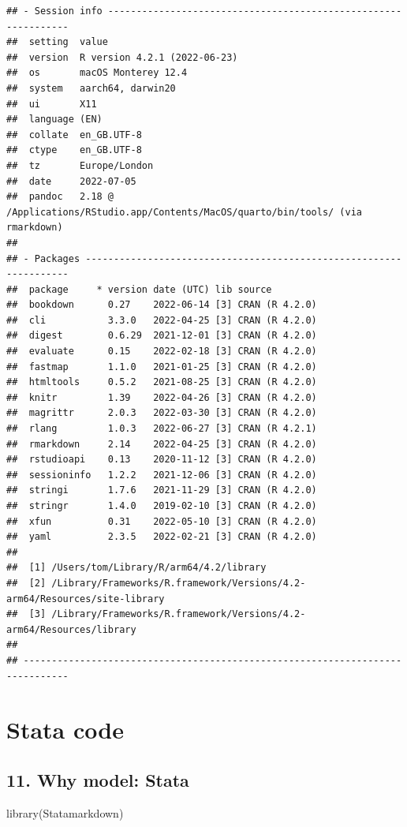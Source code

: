 \documentclass[
  10pt,
]{book}
\newenvironment{Shaded}{\begin{snugshade}}{\end{snugshade}}
\newcommand{\FunctionTok}[1]{\textcolor[rgb]{0.00,0.00,0.00}{#1}}
\newcommand{\NormalTok}[1]{#1}
\begin{document}
\begin{verbatim}
## - Session info ---------------------------------------------------------------
##  setting  value
##  version  R version 4.2.1 (2022-06-23)
##  os       macOS Monterey 12.4
##  system   aarch64, darwin20
##  ui       X11
##  language (EN)
##  collate  en_GB.UTF-8
##  ctype    en_GB.UTF-8
##  tz       Europe/London
##  date     2022-07-05
##  pandoc   2.18 @ /Applications/RStudio.app/Contents/MacOS/quarto/bin/tools/ (via rmarkdown)
## 
## - Packages -------------------------------------------------------------------
##  package     * version date (UTC) lib source
##  bookdown      0.27    2022-06-14 [3] CRAN (R 4.2.0)
##  cli           3.3.0   2022-04-25 [3] CRAN (R 4.2.0)
##  digest        0.6.29  2021-12-01 [3] CRAN (R 4.2.0)
##  evaluate      0.15    2022-02-18 [3] CRAN (R 4.2.0)
##  fastmap       1.1.0   2021-01-25 [3] CRAN (R 4.2.0)
##  htmltools     0.5.2   2021-08-25 [3] CRAN (R 4.2.0)
##  knitr         1.39    2022-04-26 [3] CRAN (R 4.2.0)
##  magrittr      2.0.3   2022-03-30 [3] CRAN (R 4.2.0)
##  rlang         1.0.3   2022-06-27 [3] CRAN (R 4.2.1)
##  rmarkdown     2.14    2022-04-25 [3] CRAN (R 4.2.0)
##  rstudioapi    0.13    2020-11-12 [3] CRAN (R 4.2.0)
##  sessioninfo   1.2.2   2021-12-06 [3] CRAN (R 4.2.0)
##  stringi       1.7.6   2021-11-29 [3] CRAN (R 4.2.0)
##  stringr       1.4.0   2019-02-10 [3] CRAN (R 4.2.0)
##  xfun          0.31    2022-05-10 [3] CRAN (R 4.2.0)
##  yaml          2.3.5   2022-02-21 [3] CRAN (R 4.2.0)
## 
##  [1] /Users/tom/Library/R/arm64/4.2/library
##  [2] /Library/Frameworks/R.framework/Versions/4.2-arm64/Resources/site-library
##  [3] /Library/Frameworks/R.framework/Versions/4.2-arm64/Resources/library
## 
## ------------------------------------------------------------------------------
\end{verbatim}

\hypertarget{part-stata-code}{%
\part*{Stata code}\label{part-stata-code}}

\hypertarget{why-model-stata}{%
\chapter*{11. Why model: Stata}\label{why-model-stata}}

\begin{Shaded}
\begin{Highlighting}[]
\FunctionTok{library}\NormalTok{(Statamarkdown)}
\end{Highlighting}
\end{Shaded}
\end{document}
